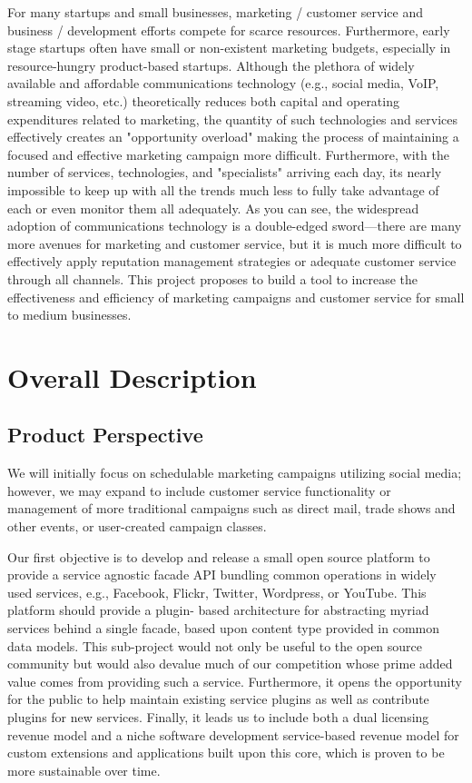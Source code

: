 \documentclass{report}
\begin{document}
For many startups and small businesses, marketing / customer service and business / 
development efforts compete for scarce resources. Furthermore, early stage startups often 
have small or non-existent marketing budgets, especially in resource-hungry product-based 
startups. Although the plethora of widely available and affordable communications 
technology (e.g., social media, VoIP, streaming video, etc.) theoretically reduces both 
capital and operating expenditures related to marketing, the quantity of such technologies 
and services effectively creates an "opportunity overload" making the process of 
maintaining a focused and effective marketing campaign more difficult. Furthermore, with 
the number of services, technologies, and "specialists" arriving each day, its nearly 
impossible to keep up with all the trends much less to fully take advantage of each or even 
monitor them all adequately. As you can see, the widespread adoption of communications 
technology is a double-edged sword---there are many more avenues for marketing and 
customer service, but it is much more difficult to effectively apply reputation management 
strategies or adequate customer service through all channels. This project proposes to 
build a tool to increase the effectiveness and efficiency of marketing campaigns and 
customer service for small to medium businesses. 

\section{Overall Description}
     \subsection{Product Perspective} %

We will initially focus on schedulable marketing campaigns utilizing social media; 
however, we may expand to include customer service functionality or management of more 
traditional campaigns such as direct mail, trade shows and other events, or user-created 
campaign classes.  
 
Our first objective is to develop and release a small open source platform to provide a 
service agnostic facade API bundling common operations in widely used services, e.g., 
Facebook, Flickr, Twitter, Wordpress, or YouTube. This platform should provide a plugin- 
based architecture for abstracting myriad services behind a single facade, based upon 
content type provided in common data models. This sub-project would not only be useful to 
the open source community but would also devalue much of our competition whose prime 
added value comes from providing such a service. Furthermore, it opens the opportunity 
for the public to help maintain existing service plugins as well as contribute plugins for new 
services. Finally, it leads us to include both a dual licensing revenue model and a niche 
software development service-based  revenue model for custom extensions and 
applications built upon this core, which is proven to be more sustainable over time.  
 
\end{document}
